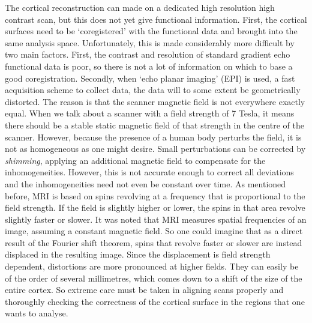 The cortical reconstruction can made on a dedicated high resolution high contrast scan, but this does not yet give functional information. First, the cortical surfaces need to be `coregistered' with the functional data and brought into the same analysis space. Unfortunately, this is made considerably more difficult by two main factors. First, the contrast and resolution of standard gradient echo functional data is poor, so there is not a lot of information on which to base a good coregistration. Secondly, when `echo planar imaging' (EPI) is used, a fast acquisition scheme to collect data, the data will to some extent be geometrically distorted. The reason is that the scanner magnetic field is not everywhere exactly equal. When we talk about a scanner with a field strength of 7 Tesla, it means there should be a stable static magnetic field of that strength in the centre of the scanner. However, because the presence of a human body perturbs the field, it is not as homogeneous as one might desire. Small perturbations can be corrected by \emph{shimming}, applying an additional magnetic field to compensate for the inhomogeneities. However, this is not accurate enough to correct all deviations and the inhomogeneities need not even be constant over time. As mentioned before, MRI is based on spins revolving at a frequency that is proportional to the field strength. If the field is slightly higher or lower, the spins in that area revolve slightly faster or slower. It was noted that MRI measures spatial frequencies of an image, assuming a constant magnetic field. So one could imagine that as a direct result of the Fourier shift theorem, spins that revolve faster or slower are instead displaced in the resulting image. Since the displacement is field strength dependent, distortions are more pronounced at higher fields. They can easily be of the order of several millimetres, which comes down to a shift of the size of the entire cortex. So extreme care must be taken in aligning scans properly and thoroughly checking the correctness of the cortical surface in the regions that one wants to analyse.


